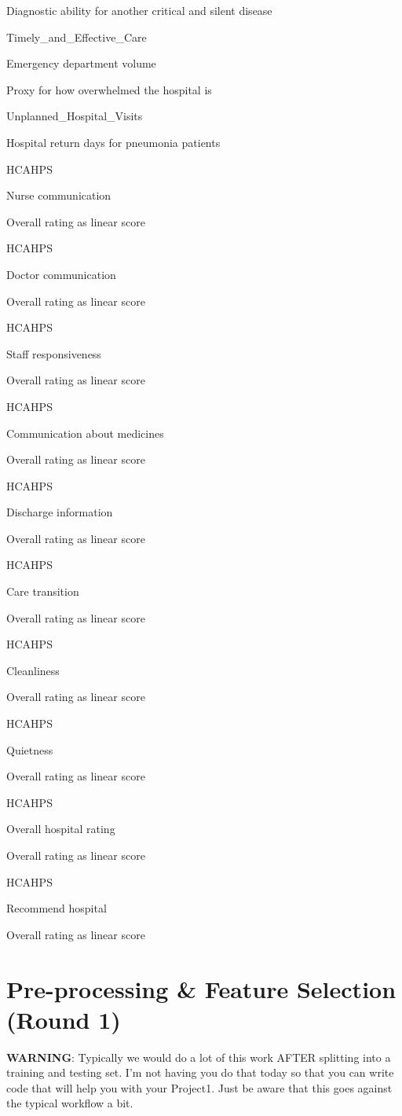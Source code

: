 \documentclass[
]{article}
\begin{document}
Diagnostic ability for another critical and silent disease

Timely\_and\_Effective\_Care

Emergency department volume

Proxy for how overwhelmed the hospital is

Unplanned\_Hospital\_Visits

Hospital return days for pneumonia patients

HCAHPS

Nurse communication

Overall rating as linear score

HCAHPS

Doctor communication

Overall rating as linear score

HCAHPS

Staff responsiveness

Overall rating as linear score

HCAHPS

Communication about medicines

Overall rating as linear score

HCAHPS

Discharge information

Overall rating as linear score

HCAHPS

Care transition

Overall rating as linear score

HCAHPS

Cleanliness

Overall rating as linear score

HCAHPS

Quietness

Overall rating as linear score

HCAHPS

Overall hospital rating

Overall rating as linear score

HCAHPS

Recommend hospital

Overall rating as linear score

\section{Pre-processing \& Feature Selection (Round
1)}\label{pre-processing-feature-selection-round-1}

\textbf{WARNING}: Typically we would do a lot of this work AFTER
splitting into a training and testing set. I'm not having you do that
today so that you can write code that will help you with your Project1.
Just be aware that this goes against the typical workflow a bit.
\end{document}
